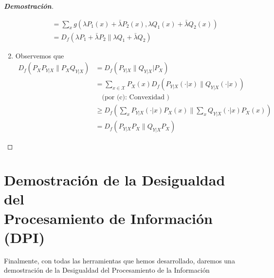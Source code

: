 \begin{proof}[\textbf{Demostraci\'on}]
\begin{enumerate}[label=(\alph*)]
\begin{align*}
        &=\sum_{x}g\left(\lambda P_1(x)+\bar{\lambda}P_2(x),\lambda Q_1(x)+\bar{\lambda}Q_2(x)\right)\\
        &=D_f(\lambda P_1+\bar{\lambda}P_2\|\lambda Q_1+\bar{\lambda}Q_2)
    \end{align*}
    \item Observemos que 
    \begin{align*}
        D_f(P_XP_{Y|X}\|P_XQ_{Y|X})&=D_f(P_{Y|X}\|Q_{Y|X}|P_X)\\
        &=\sum_{x\in\mathcal{X}}P_X(x)D_f\left(P_{Y|X}(\cdot|x)\|Q_{Y|X}(\cdot|x)\right)\\
        &\quad\text{(por (c): Convexidad )}\\
        &\geq D_f\left(\sum_xP_{Y|X}(\cdot|x)P_X(x)\Bigg\|\sum_xQ_{Y|X}(\cdot|x)P_X(x)\right)\\
        &=D_f(P_{Y|X}P_X\|Q_{Y|X}P_X)
    \end{align*}
\end{enumerate}
\end{proof}

\section{Demostraci\'on de la Desigualdad del\\
Procesamiento de Informaci\'on (DPI)}

\noindent Finalmente, con todas las herramientas que hemos desarrollado, daremos una demostraci\'on de la Desigualdad del Procesamiento de la Informaci\'on

